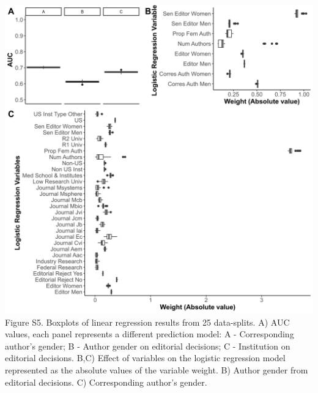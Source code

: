 \documentclass[11pt,]{article}
\begin{document}
\includegraphics{Figure_S5.png} Figure S5. Boxplots of linear regression
results from 25 data-splits. A) AUC values, each panel represents a
different prediction model: A - Corresponding author's gender; B -
Author gender on editorial decisions; C - Institution on editorial
decisions. B,C) Effect of variables on the logistic regression model
represented as the absolute values of the variable weight. B) Author
gender from editorial decisions. C) Corresponding author's gender.

\newpage
\end{document}
